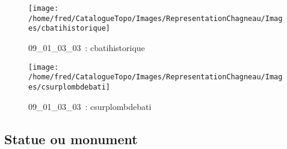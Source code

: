 \documentclass[12pt,titlepage]{book}
\begin{document}
\begin{figure}[h!]
\begin{minipage}[t]{3cm}
    \begin{center}
      \texttt{[image: /home/fred/CatalogueTopo/Images/RepresentationChagneau/Images/cbatihistorique]}
      \caption[~09\_01\_03\_03]{\small{09\_01\_03\_03~:} \tiny{cbatihistorique}}\label{cbatihistorique}
    \end{center}
  \end{minipage}
  \begin{minipage}[t]{3cm}
    \begin{center}
      \texttt{[image: /home/fred/CatalogueTopo/Images/RepresentationChagneau/Images/csurplombdebati]}
      \caption[~09\_01\_03\_03]{\small{09\_01\_03\_03~:} \tiny{csurplombdebati}}\label{csurplombdebati}
    \end{center}
  \end{minipage}
\end{figure}


\subsection{Statue ou monument}
\noindent
\vspace{\baselineskip}
\end{document}
